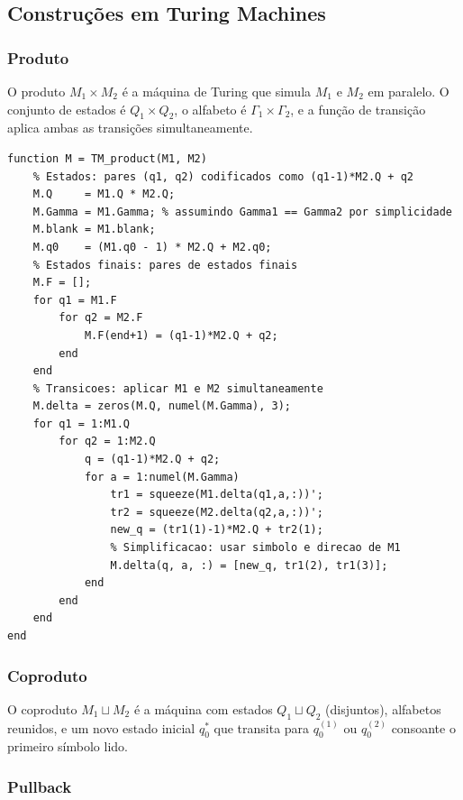 \subsection{Construções em \textbf{Turing Machines}}
\label{subsec:turing-constructions}

\subsubsection{Produto}

O produto $M_1 \times M_2$ é a máquina de Turing que simula $M_1$ e $M_2$ em paralelo. O conjunto de estados é $Q_1 \times Q_2$, o alfabeto é $\Gamma_1 \times \Gamma_2$, e a função de transição aplica ambas as transições simultaneamente.

\begin{lstlisting}[style=matlab, caption={Produto de duas Máquinas de Turing}]
function M = TM_product(M1, M2)
    % Estados: pares (q1, q2) codificados como (q1-1)*M2.Q + q2
    M.Q     = M1.Q * M2.Q;
    M.Gamma = M1.Gamma; % assumindo Gamma1 == Gamma2 por simplicidade
    M.blank = M1.blank;
    M.q0    = (M1.q0 - 1) * M2.Q + M2.q0;
    % Estados finais: pares de estados finais
    M.F = [];
    for q1 = M1.F
        for q2 = M2.F
            M.F(end+1) = (q1-1)*M2.Q + q2;
        end
    end
    % Transicoes: aplicar M1 e M2 simultaneamente
    M.delta = zeros(M.Q, numel(M.Gamma), 3);
    for q1 = 1:M1.Q
        for q2 = 1:M2.Q
            q = (q1-1)*M2.Q + q2;
            for a = 1:numel(M.Gamma)
                tr1 = squeeze(M1.delta(q1,a,:))';
                tr2 = squeeze(M2.delta(q2,a,:))';
                new_q = (tr1(1)-1)*M2.Q + tr2(1);
                % Simplificacao: usar simbolo e direcao de M1
                M.delta(q, a, :) = [new_q, tr1(2), tr1(3)];
            end
        end
    end
end
\end{lstlisting}

\subsubsection{Coproduto}

O coproduto $M_1 \sqcup M_2$ é a máquina com estados $Q_1 \sqcup Q_2$ (disjuntos), alfabetos reunidos, e um novo estado inicial $q_0^*$ que transita para $q_0^{(1)}$ ou $q_0^{(2)}$ consoante o primeiro símbolo lido.

\subsubsection{Pullback}

